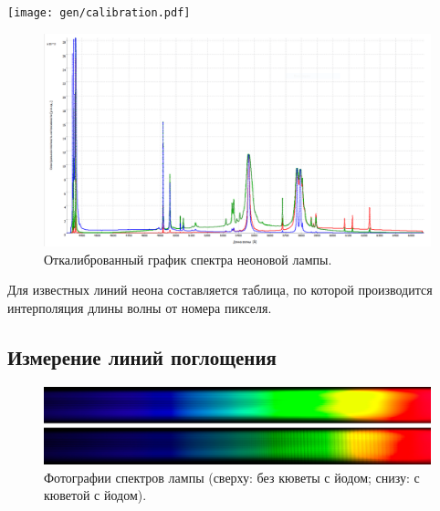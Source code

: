 \documentclass[12pt,a4paper]{article}
\begin{document}
	\begin{minipage}{\textwidth}
		\begin{minipage}[]{0.6\textwidth}
			\centering
			\texttt{[image: gen/calibration.pdf]}
		\end{minipage}
		\hfill
		\begin{minipage}[]{0.39\textwidth}
			\centering
			\footnotesize
			
		\end{minipage}
	\end{minipage}
	
	\begin{figure}[H]
		\centering
		\includegraphics[width=0.8\linewidth]{data/323_1s/spectrum.png}
		\caption{Откалиброванный график спектра неоновой лампы.}
		\label{fig:calibration_spectrum}
	\end{figure}
	
	Для известных линий неона составляется таблица, по которой производится интерполяция длины волны от номера пикселя.
	
	\subsection*{Измерение линий поглощения}
	
	\begin{figure}[H]
		\centering
		\includegraphics[width=0.8\linewidth]{data/326_2/merged.png}
		\caption{Фотографии спектров лампы (сверху: без кюветы с йодом; снизу: с кюветой с йодом).}
		\label{fig:iodine_photo}
	\end{figure}
	
\end{document}
